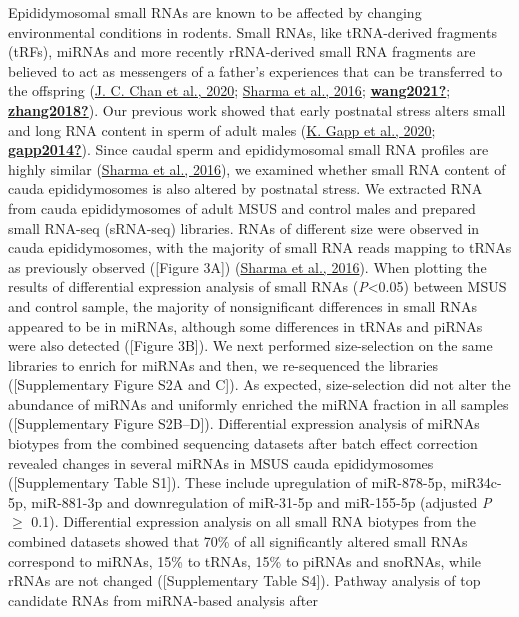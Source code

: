 \documentclass[12pt,twoside]{reedthesis}
\begin{document}
Epididymosomal small RNAs are known to be affected by changing
environmental conditions in rodents. Small RNAs, like tRNA-derived
fragments (tRFs), miRNAs and more recently rRNA-derived small RNA
fragments are believed to act as messengers of a father's experiences
that can be transferred to the offspring (\protect\hyperlink{ref-chan2020}{J. C. Chan et al., 2020}; \protect\hyperlink{ref-sharma2016}{Sharma et al., 2016}; \protect\hyperlink{ref-wang2021}{\textbf{wang2021?}}; \protect\hyperlink{ref-zhang2018}{\textbf{zhang2018?}}). Our previous work showed that early postnatal
stress alters small and long RNA content in sperm of adult males
(\protect\hyperlink{ref-gapp2020}{K. Gapp et al., 2020}; \protect\hyperlink{ref-gapp2014}{\textbf{gapp2014?}}). Since caudal sperm and epididymosomal small RNA
profiles are highly similar (\protect\hyperlink{ref-sharma2016}{Sharma et al., 2016}), we examined whether small RNA
content of cauda epididymosomes is also altered by postnatal stress. We
extracted RNA from cauda epididymosomes of adult MSUS and control males
and prepared small RNA-seq (sRNA-seq) libraries. RNAs of different size
were observed in cauda epididymosomes, with the majority of small RNA
reads mapping to tRNAs as previously observed ({[}Figure 3A{]})
(\protect\hyperlink{ref-sharma2016}{Sharma et al., 2016}). When plotting the results of differential expression
analysis of small RNAs (\emph{P}\textless0.05) between MSUS and control sample, the
majority of nonsignificant differences in small RNAs appeared to be in
miRNAs, although some differences in tRNAs and piRNAs were also detected
({[}Figure 3B{]}). We next performed size-selection on the same libraries to
enrich for miRNAs and then, we re-sequenced the libraries
({[}Supplementary Figure S2A and C{]}).
As expected, size-selection did not alter the abundance of miRNAs and
uniformly enriched the miRNA fraction in all samples ({[}Supplementary
Figure
S2B--D{]}).
Differential expression analysis of miRNAs biotypes from the combined
sequencing datasets after batch effect correction revealed changes in
several miRNAs in MSUS cauda epididymosomes ({[}Supplementary Table
S1{]}).
These include upregulation of miR-878-5p, miR34c-5p, miR-881-3p and
downregulation of miR-31-5p and miR-155-5p (adjusted \emph{P} \(\geq\) 0.1).
Differential expression analysis on all small RNA biotypes from the
combined datasets showed that 70\% of all significantly altered small
RNAs correspond to miRNAs, 15\% to tRNAs, 15\% to piRNAs and snoRNAs,
while rRNAs are not changed ({[}Supplementary Table
S4{]}).
Pathway analysis of top candidate RNAs from miRNA-based analysis after
\end{document}
